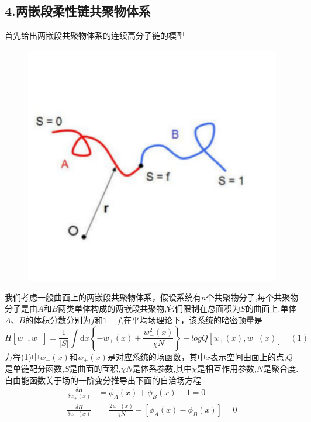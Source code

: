 \documentclass{article}
\begin{document}
\subsection{4.两嵌段柔性链共聚物体系}
首先给出两嵌段共聚物体系的连续高分子链的模型
\begin{figure}[H]
\centering
\includegraphics[scale=0.5]{./figures/dblock.pdf}
\caption{}
\end{figure}
我们考虑一般曲面上的两嵌段共聚物体系，假设系统有$n$个共聚物分子,每个共聚物分子是由$A$和$B$两类单体构成的两嵌段共聚物,它们限制在总面积为$S$的曲面上.单体$A$、$B$的体积分数分别为$f$和$1-f$,在平均场理论下，该系统的哈密顿量是
\begin{equation*}
H[w_+,w_-]=\frac{1}{\left|S\right|}\int\mathrm{d}x\left\{-w_+(x)+\frac{w_-^2(x)}{\chi N}\right\}-logQ[w_+(x),w_-(x)]\quad(1)
\end{equation*}
方程(1)中$w_-(x)$和$w_+(x)$是对应系统的场函数，其中$x$表示空间曲面上的点,$Q$是单链配分函数,$S$是曲面的面积,$\chi N$是体系参数,其中$\chi$是相互作用参数,$N$是聚合度.自由能函数关于场的一阶变分推导出下面的自洽场方程
\begin{equation*}
\begin{aligned}
\frac{\delta H}{\delta w_+(x)}&=\phi_A(x)+\phi_B(x)-1=0\\
\frac{\delta H}{\delta w_-(x)}&=\frac{2w_-(x)}{\chi N}-[\phi_A(x)-\phi_B(x)]=0
\end{aligned}
\end{equation*}
\end{document}
